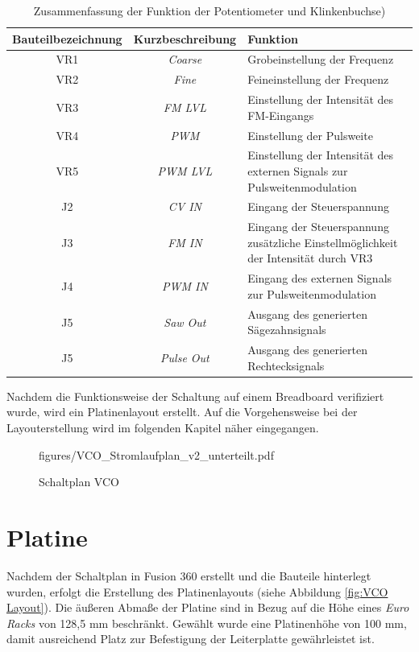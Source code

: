 \begin{table}[h]
	\centering
	\caption{Zusammenfassung der Funktion der Potentiometer und Klinkenbuchse)}
	\begin{tabular}{|c|c|p{8cm}|}
		\hline
		Bauteilbezeichnung & Kurzbeschreibung & Funktion \\
		\hline
		VR1 & \textit{Coarse} & Grobeinstellung der Frequenz \\
		\hline
		VR2 & \textit{Fine} & Feineinstellung der Frequenz \\
		\hline
		VR3 & \textit{FM LVL} & Einstellung der Intensität des FM-Eingangs \\
		\hline
		VR4 & \textit{PWM} & Einstellung der Pulsweite\\
		\hline
		VR5 & \textit{PWM LVL} &  Einstellung der Intensität des externen Signals zur Pulsweitenmodulation \\
		\hline
		J2 &  \textit{CV IN} & Eingang der Steuerspannung \\
		\hline
		J3 & \textit{FM IN} & Eingang der Steuerspannung \newline zusätzliche Einstellmöglichkeit der Intensität durch VR3 \\
		\hline
		J4 & \textit{PWM IN} &  Eingang des externen Signals zur Pulsweitenmodulation\\
		\hline
		J5 & \textit{Saw Out} &  Ausgang des generierten Sägezahnsignals\\
		\hline
		J5 & \textit{Pulse Out} &  Ausgang des generierten Rechtecksignals \\
		\hline
	\end{tabular}
\end{table}


Nachdem die Funktionsweise der Schaltung auf einem Breadboard verifiziert wurde, wird ein Platinenlayout erstellt.
Auf die Vorgehensweise bei der Layouterstellung wird im folgenden Kapitel näher eingegangen.



\newpage
\begin{figure}[h]
\centering
 {figures/VCO_Stromlaufplan_v2_unterteilt.pdf}
\caption{Schaltplan VCO}
\label{fig:VCO_Stromlaufplan}
\end{figure}

\newpage

\section{Platine}
Nachdem der Schaltplan in Fusion 360 erstellt und die Bauteile hinterlegt wurden, erfolgt die Erstellung des Platinenlayouts (siehe Abbildung \ref{fig:VCO Layout}).
Die äußeren Abmaße der Platine sind in Bezug auf die Höhe eines \textit{Euro Racks }von 128,5 mm beschränkt. 
Gewählt wurde eine Platinenhöhe von 100 mm, damit ausreichend Platz zur Befestigung der Leiterplatte gewährleistet ist.

